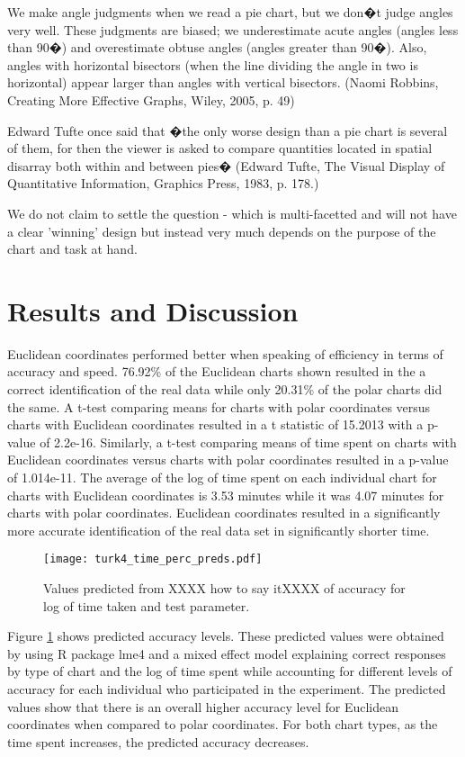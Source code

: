 	
	We make angle judgments when we read a pie chart, but we don�t judge angles very well. These judgments are biased; we underestimate acute angles (angles less than 90�) and overestimate obtuse angles (angles greater than 90�). Also, angles with horizontal bisectors (when the line dividing the angle in two is horizontal) appear larger than angles with vertical bisectors. (Naomi Robbins, Creating More Effective Graphs, Wiley, 2005, p. 49)
	
	 Edward Tufte once said that �the only worse design than a pie chart is several of them, for then the viewer is asked to compare quantities located in spatial disarray both within and between pies� (Edward Tufte, The Visual Display of Quantitative Information, Graphics Press, 1983, p. 178.)

 We do not claim to settle the question - which is multi-facetted and will not have a clear 'winning' design but instead very much depends on the purpose of the chart and task at hand.

\section{Results and Discussion}

Euclidean coordinates performed better when speaking of efficiency in terms of accuracy and speed. 76.92\% of the Euclidean charts shown resulted in the a correct identification of the real data while only 20.31\% of the polar charts did the same. A t-test comparing means for charts with polar coordinates versus charts with Euclidean coordinates resulted in a t statistic of 15.2013 with a p-value of 2.2e-16. Similarly, a t-test comparing means of time spent on charts with Euclidean coordinates versus charts with polar coordinates resulted in a p-value of 1.014e-11. The average of the log of time spent on each individual chart for charts with Euclidean coordinates is 3.53 minutes while it was 4.07 minutes for charts with polar coordinates. Euclidean coordinates resulted in a significantly more accurate identification of the real data set in significantly shorter time. 

\begin{figure}[htbp] %
   \centering
   \texttt{[image: turk4\_time\_perc\_preds.pdf]}  
   \caption{Values predicted from XXXX how to say itXXXX of accuracy for log of time taken and test parameter.}
   \label{accuracy_preds}
\end{figure}

Figure \ref{accuracy_preds} shows predicted accuracy levels. These predicted values were obtained by using R package lme4 and a mixed effect model explaining correct responses by type of chart and the log of time spent while accounting for different levels of accuracy for each individual who participated in the experiment. The predicted values show that there is an overall higher accuracy level for Euclidean coordinates when compared to polar coordinates. For both chart types, as the time spent increases, the predicted accuracy decreases. 



